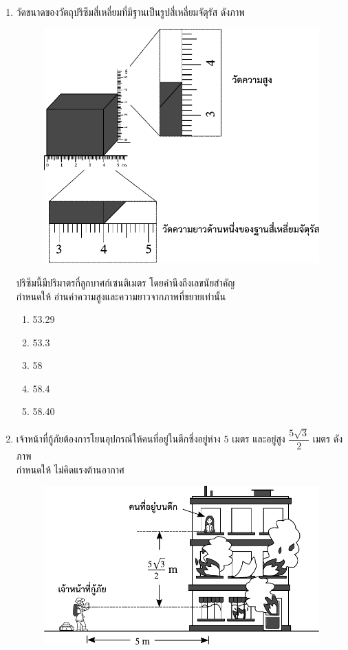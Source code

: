 \documentclass[a4paper, 12pt]{article}
\begin{document}
\begin{enumerate}
    \item วัดขนาดของวัตถุปริซึมสี่เหลี่ยมที่มีฐานเป็นรูปสี่เหลี่ยมจัตุรัส ดังภาพ \\
          \begin{figure}[H]
              \centering
              \includegraphics{images/5_1.pdf}
          \end{figure}
          ปริซึมนี้มีปริมาตรกี่ลูกบาศก์เซนติเมตร โดยคำนึงถึงเลขนัยสำคัญ \\
          กำหนดให้ อ่านค่าความสูงและความยาวจากภาพที่ขยายเท่านั้น
          \begin{enumerate}
              \item 53.29
              \item 53.3
              \item 58
              \item 58.4
              \item 58.40
          \end{enumerate}
          \newpage
    \item เจ้าหน้าที่กู้ภัยต้องการโยนอุปกรณ์ให้คนที่อยู่ในตึกซึ่งอยู่ห่าง \(5\) เมตร และอยู่สูง \(\dfrac{5\sqrt{3}}{2}\) เมตร ดังภาพ \\
          กำหนดให้ ไม่คิดแรงต้านอากาศ \\
          \begin{figure}[H]
              \centering
              \includegraphics{images/2_2.pdf}

\end{figure}
\end{enumerate}
\end{document}
